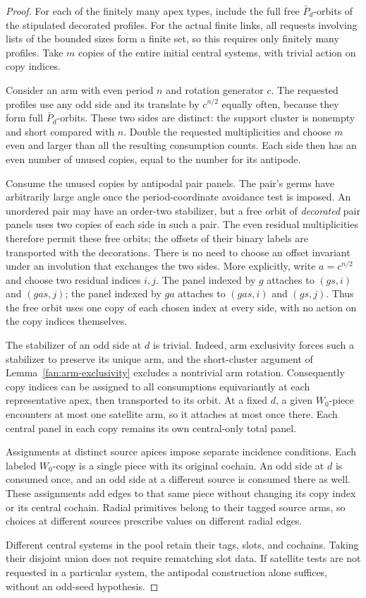 \begin{proof}
For each of the finitely many apex types, include the full free
$\bar P_d$-orbits of the stipulated decorated profiles. For the actual
finite links, all requests involving lists of the bounded sizes form a
finite set, so this requires only finitely many profiles. Take $m$ copies of
the entire initial central systems, with trivial action on copy indices.

Consider an arm with even period $n$ and rotation generator $c$. The
requested profiles use any odd side and its translate by $c^{n/2}$ equally
often, because they form full $\bar P_d$-orbits. These two sides are distinct:
the support cluster is nonempty and short compared with $n$. Double the
requested multiplicities and choose $m$ even and larger than all the
resulting consumption counts. Each side then has an even number of unused
copies, equal to the number for its antipode.

Consume the unused copies by antipodal pair panels. The pair's germs have
arbitrarily large angle once the period-coordinate avoidance test is
imposed. An unordered pair may have an order-two stabilizer, but a free
orbit of \emph{decorated} pair panels uses two copies of each side in such a
pair. The even residual multiplicities therefore permit these free orbits;
the offsets of their binary labels are transported with the decorations.
There is no need to choose an offset invariant under an involution that
exchanges the two sides.
More explicitly, write $a=c^{n/2}$ and choose two residual indices $i,j$.
The panel indexed by $g$ attaches to $(gs,i)$ and $(gas,j)$; the panel
indexed by $ga$ attaches to $(gas,i)$ and $(gs,j)$. Thus the free orbit
uses one copy of each chosen index at every side, with no action on the
copy indices themselves.

The stabilizer of an odd side at $d$ is trivial. Indeed, arm exclusivity
forces such a stabilizer to preserve its unique arm, and the short-cluster
argument of Lemma~\ref{fan:arm-exclusivity} excludes a nontrivial arm
rotation. Consequently copy indices can be assigned to all consumptions
equivariantly at each representative apex, then transported to its orbit.
At a fixed $d$, a given $W_0$-piece encounters at most one satellite arm, so it attaches
at most once there. Each central panel in each copy remains its own
central-only total panel.

Assignments at distinct source apices impose separate incidence
conditions. Each labeled $W_0$-copy is a single piece with its
original cochain. An odd side at $d$ is consumed once, and an odd side at a
different source is consumed there as well. These assignments add
edges to that same piece without changing its copy index or its central
cochain. Radial primitives belong to their tagged source arms, so choices
at different sources prescribe values on different radial edges.

Different central systems in the pool retain their tags, slots, and
cochains. Taking their disjoint union does not require rematching slot
data. If satellite tests are not requested in a particular system, the
antipodal construction alone suffices, without an odd-seed hypothesis.
\end{proof}

